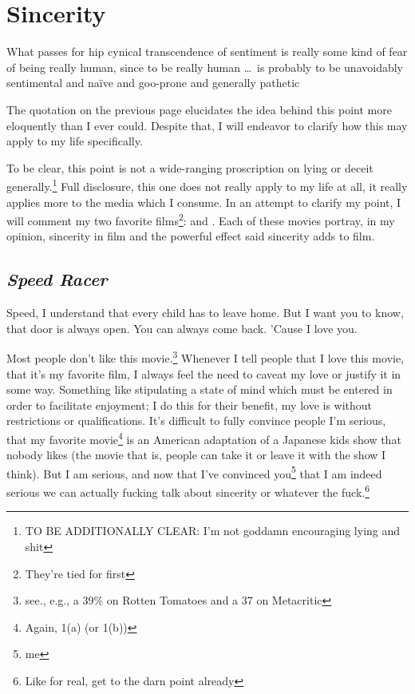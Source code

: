 \documentclass[../philo.tex]{subfiles}
\begin{document}
\chapter{Sincerity}
\epigraph{What passes for hip cynical transcendence of sentiment is really some kind of fear of being really human, since to be really human \dots\ is probably to be unavoidably sentimental and na\"{i}ve and goo-prone and generally pathetic}{}
\newpage

The quotation on the previous page elucidates the idea behind this point more eloquently than I ever could.
Despite that, I will endeavor to clarify how this may apply to my life specifically.

To be clear, this point is not a wide-ranging proscription on lying or deceit generally.\footnote{TO BE ADDITIONALLY CLEAR: I'm not goddamn encouraging lying and shit}
Full disclosure, this one does not really apply to my life at all, it really applies more to the media which I consume.
In an attempt to clarify my point, I will comment my two favorite films\footnote{They're tied for first}:  and .
Each of these movies portray, in my opinion, sincerity in film and the powerful effect said sincerity adds to film.

\vspace{1em}

\section{\textit{Speed Racer}}
\epigraph{Speed, I understand that every child has to leave home. But I want you to know, that door is always open. You can always come back. 'Cause I love you.}{}

Most people don't like this movie.\footnote{see., e.g., a 39\% on Rotten Tomatoes and a 37 on Metacritic}
Whenever I tell people that I love this movie, that it's my favorite film, I always feel the need to caveat my love or justify it in some way.
Something like stipulating a state of mind which must be entered in order to facilitate enjoyment; I do this for their benefit, my love is without restrictions or qualifications.
It's difficult to fully convince people I'm serious, that my favorite movie\footnote{Again, 1(a) (or 1(b))} is an American adaptation of a Japanese kids show that nobody likes (the movie that is, people can take it or leave it with the show I think).
But I am serious, and now that I've convinced you\footnote{me} that I am indeed serious we can actually fucking talk about sincerity or whatever the fuck.\footnote{Like for real, get to the darn point already}
\end{document}
